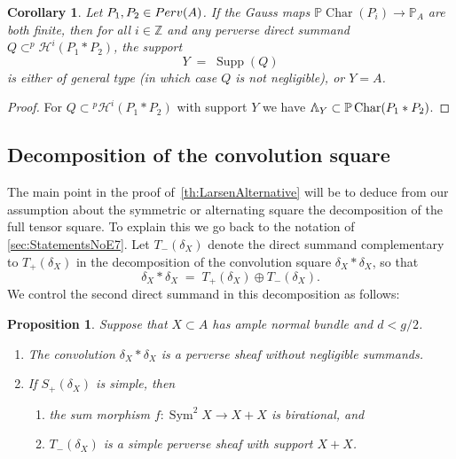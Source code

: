 \documentclass[a4paper]{amsart}
\newcommand{\bbP}{\mathbb{P}}
\newcommand{\bbV}{\mathbb{V}}
\newcommand{\bbZ}{\mathbb{Z}}
\newcommand{\cH}{\mathcal{H}}
\newcommand{\Perv}{\textup{Perv}}
\newcommand{\PLambda}{\scalerel*{{\rotatebox[origin=c]{180}{$\bbV$}}}{\bbV}}
\DeclareMathOperator{\Sym}{Sym}
\DeclareMathOperator{\Supp}{Supp}
\DeclareMathOperator{\Char}{Char}
\newcommand{\PChar}{\bbP\Char}
\theoremstyle{plain}
\newtheorem{proposition}[theorem]{Proposition}
\newtheorem{corollary}[theorem]{Corollary}
\theoremstyle{definition}
\numberwithin{equation}{section}
\begin{document}
\begin{corollary} \label{cor:no-negligibles}
Let $P_1, P_2\in \Perv(A)$. If the Gauss maps $\PChar(P_i)\to \bbP_A$ are both finite, then for all $i\in \bbZ$ and any perverse direct summand 
%
$Q\subset ^p\cH^i(P_1*P_2)$, 
%
the support \[ Y \;=\; \Supp(Q) \] is either of general type (in which case $Q$ is not negligible), or $Y=A$.
\end{corollary} 

\begin{proof} 
For $Q \subset {}^p\cH^i(P_1*P_2)$ with support $Y$ we have $\PLambda_Y \subset \PChar(P_1*P_2)$.
\end{proof}


\subsection{Decomposition of the convolution square} 
The main point in the proof of~\cref{th:LarsenAlternative} will be to deduce from our assumption about the symmetric or alternating square the decomposition of the full tensor square. To explain this we go back to the notation of \cref{sec:StatementsNoE7}. Let $T_-(\delta_X)$ denote the direct summand complementary to $T_+(\delta_X)$ in the decomposition of the convolution square $\delta_X \ast \delta_X$, so that
%
\[ \delta_X*\delta_X \;=\; T_+(\delta_X) \oplus T_-(\delta_X). \]
%
%
We control the second direct summand in this decomposition as follows:
 
\begin{proposition} \label{prop:larsen-alternative}
Suppose that $X\subset A$ has ample normal bundle and $d < g/2$.\smallskip
%
\begin{enumerate} 
\item The convolution $\delta_X * \delta_X$ is a perverse sheaf without negligible summands.\smallskip 
\item If $S_+(\delta_X)$ is simple, then \smallskip
\begin{enumerate} 
\item the sum morphism $f\colon \Sym^2 X \to X + X$ is birational, and\smallskip
\item $T_-(\delta_X)$ is a simple perverse sheaf with support $X+X$.
\end{enumerate} 
\end{enumerate}
\end{proposition}
\end{document}
